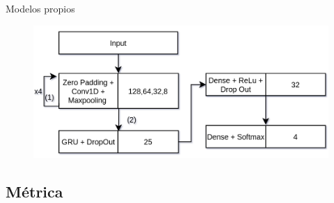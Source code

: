 \begin{frame}{Modelos propios}
\begin{overprint}
        \begin{figure}
            \centering
            \includegraphics[keepaspectratio=true,height=0.65\paperheight,width=0.8\paperwidth]{Images/GRU diagram.png}
        \end{figure}
\end{overprint}
\end{frame}




\subsection{Métrica}

